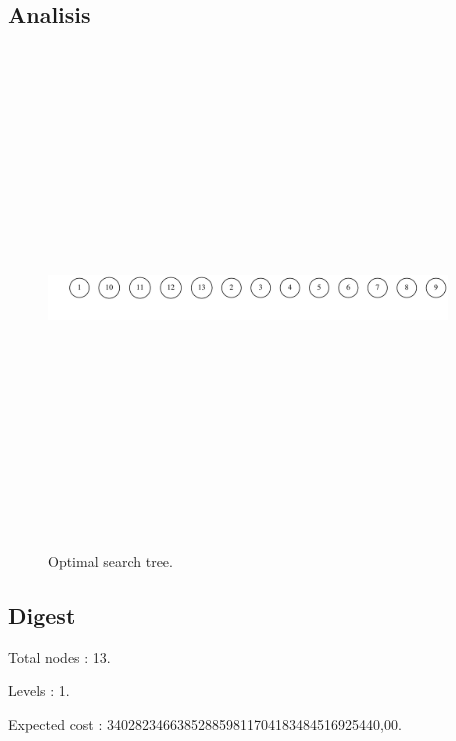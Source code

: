\documentclass{article}
\begin{document}
\subsection{Analisis}
\begin{figure}[H]\centering
\noindent\includegraphics[height=500px, width=400px, keepaspectratio]{reports/tree.pdf}
\caption{Optimal search tree.}
\end{figure}
\newpage

\subsection{Digest}
\begin{compactitem}
\item Total nodes : {\Large 13}.
\item Levels : {\Large 1}.
\item Expected cost : {\Large 340282346638528859811704183484516925440,00}.
\end{compactitem}
\end{document}
